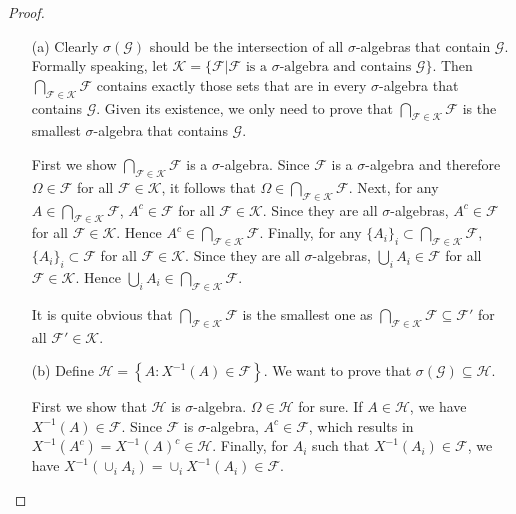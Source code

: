 \begin{proof}
\begin{enumerate}
    \item[(a)] Clearly $\sigma(\mathcal{G})$ should be the intersection of all $\sigma$-algebras that contain $\mathcal{G}$. Formally speaking, let $\mathcal{K} = \{\mathcal{F} | \mathcal{F} \mbox{ is a }\sigma\mbox{-algebra and contains } \mathcal{G}\}$. Then $\bigcap_{\mathcal{F} \in \mathcal{K}}\mathcal{F}$ contains exactly those sets that are in every $\sigma$-algebra that contains $\mathcal{G}$. Given its existence, we only need to prove that $\bigcap_{\mathcal{F} \in \mathcal{K}}\mathcal{F}$ is the smallest $\sigma$-algebra that contains $\mathcal{G}$.

    First we show $\bigcap_{\mathcal{F} \in \mathcal{K}}\mathcal{F}$ is a $\sigma$-algebra. Since $\mathcal{F}$ is a $\sigma$-algebra and therefore $\Omega \in \mathcal{F}$ for all $\mathcal{F} \in \mathcal{K}$, it follows that $\Omega \in \bigcap_{\mathcal{F} \in \mathcal{K}}\mathcal{F}$. Next, for any $A \in \bigcap_{\mathcal{F} \in \mathcal{K}}\mathcal{F}$, $A^c \in \mathcal{F}$ for all $\mathcal{F} \in \mathcal{K}$. Since they are all $\sigma$-algebras, $A^c \in \mathcal{F}$ for all $\mathcal{F} \in \mathcal{K}$. Hence $A^c \in \bigcap_{\mathcal{F} \in \mathcal{K}}\mathcal{F}$. Finally, for any $\{A_i\}_i \subset \bigcap_{\mathcal{F} \in \mathcal{K}}\mathcal{F}$, $\{A_i\}_i \subset \mathcal{F}$ for all $\mathcal{F} \in \mathcal{K}$. Since they are all $\sigma$-algebras, $\bigcup_i A_i \in \mathcal{F}$ for all $\mathcal{F} \in \mathcal{K}$. Hence $\bigcup_i A_i \in \bigcap_{\mathcal{F} \in \mathcal{K}}\mathcal{F}$.

    It is quite obvious that $\bigcap_{\mathcal{F} \in \mathcal{K}}\mathcal{F}$ is the smallest one as $\bigcap_{\mathcal{F} \in \mathcal{K}}\mathcal{F} \subseteq \mathcal{F}'$ for all $\mathcal{F}' \in \mathcal{K}$.

    \item[(b)] Define $\mathcal{H}=\left\{A: X^{-1}(A) \in \mathcal{F}\right\}$.
    We want to prove that $\sigma(\mathcal{G}) \subseteq \mathcal{H}$.

    First we show that $\mathcal{H}$ is $\sigma$-algebra.
    $\Omega \in \mathcal{H}$ for sure.
    If $A \in \mathcal{H}$, we have $X^{-1}(A) \in \mathcal{F}$.
    Since $\mathcal{F}$ is $\sigma$-algebra, $A^c \in \mathcal{F}$, which results in $X^{-1}(A^c) = X^{-1}(A)^c \in \mathcal{H}$.
    Finally, for $A_i$ such that $X^{-1}(A_i) \in \mathcal{F}$, we have $X^{-1}(\cup_i A_i) = \cup_i X^{-1}(A_i) \in \mathcal{F}$.


\end{enumerate}
\end{proof}
